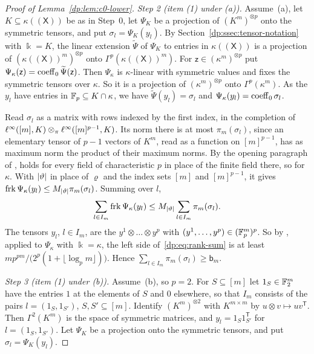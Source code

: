 \begin{proof}[Proof of Lemma~\ref{dp:lem:c0-lower}]
\emph{Step 2 (item (1) under (a)).} Assume~(a), let $K\subseteq\kappa((\mathsf X))$ be as in Step~0, let $\Psi_K$ be a projection of $(K^m)^{\otimes p}$ onto the symmetric tensors, and put $\sigma_l=\Psi_K(y_l)$. By Section~\ref{dp:ssec:tensor-notation} with $\Bbbk=K$, the linear extension $\widetilde\Psi$ of $\Psi_K$ to entries in $\kappa((\mathsf X))$ is a projection of $(\kappa((\mathsf X))^m)^{\otimes p}$ onto $\Gamma^p(\kappa((\mathsf X))^m)$. For $\mathsf z\in(\kappa^m)^{\otimes p}$ put $\Psi_\kappa(\mathsf z)=\operatorname{coeff}_0\widetilde\Psi(\mathsf z)$. Then $\Psi_\kappa$ is $\kappa$\nobreakdash-linear with symmetric values and fixes the symmetric tensors over $\kappa$. So it is a projection of $(\kappa^m)^{\otimes p}$ onto $\Gamma^p(\kappa^m)$. As the $y_l$ have entries in $\mathbb F_p\subseteq K\cap\kappa$, we have $\widetilde\Psi(y_l)=\sigma_l$ and $\Psi_\kappa(y_l)=\operatorname{coeff}_0\sigma_l$.

Read $\sigma_l$ as a matrix with rows indexed by the first index, in the completion of $\ell^\infty([m],K)\otimes_\pi\ell^\infty([m]^{p-1},K)$. Its norm there is at most $\pi_m(\sigma_l)$, since an elementary tensor of $p-1$ vectors of $K^m$, read as a function on $[m]^{p-1}$, has as maximum norm the product of their maximum norms. By the opening paragraph of \cite[Appendix~K]{I}, \cite[Lemma~K.2(2)]{I} holds for every field of characteristic $p$ in place of the finite field there, so for $\kappa$. With $\lvert \vartheta\rvert$ in place of $\varrho$ and the index sets $[m]$ and $[m]^{p-1}$, it gives $\operatorname{frk}\Psi_\kappa(y_l)\le M_{\lvert \vartheta\rvert}\pi_m(\sigma_l)$. Summing over $l$,
\begin{equation}\label{dp:eq:rank-sum}
 \sum_{l\in I_m}\operatorname{frk}\Psi_\kappa(y_l)\le M_{\lvert \vartheta\rvert}\sum_{l\in I_m}\pi_m(\sigma_l).
\end{equation}
The tensors $y_l$, $l\in I_m$, are the $y^1\otimes\dots\otimes y^p$ with $(y^1,\dots,y^p)\in(\mathbb F_p^m)^p$. So by \cite[Lemma~Q.6(4)]{I}, applied to $\Psi_\kappa$ with $\Bbbk=\kappa$, the left side of~\eqref{dp:eq:rank-sum} is at least $mp^{pm}/\bigl(2^p(1+\lfloor\log_pm\rfloor)\bigr)$. Hence $\sum_{l\in I_m}\pi_m(\sigma_l)\ge\mathsf b_m$.

\emph{Step 3 (item (1) under (b)).} Assume~(b), so $p=2$. For $S\subseteq[m]$ let $1_S\in\mathbb F_2^m$ have the entries $1$ at the elements of $S$ and $0$ elsewhere, so that $I_m$ consists of the pairs $l=(1_S,1_{S'})$, $S,S'\subseteq[m]$. Identify $(K^m)^{\otimes2}$ with $K^{m\times m}$ by $u\otimes v\mapsto uv^{\mathsf T}$. Then $\Gamma^2(K^m)$ is the space of symmetric matrices, and $y_l=1_S1_{S'}^{\mathsf T}$ for $l=(1_S,1_{S'})$. Let $\Psi_K$ be a projection onto the symmetric tensors, and put $\sigma_l=\Psi_K(y_l)$.


\end{proof}
